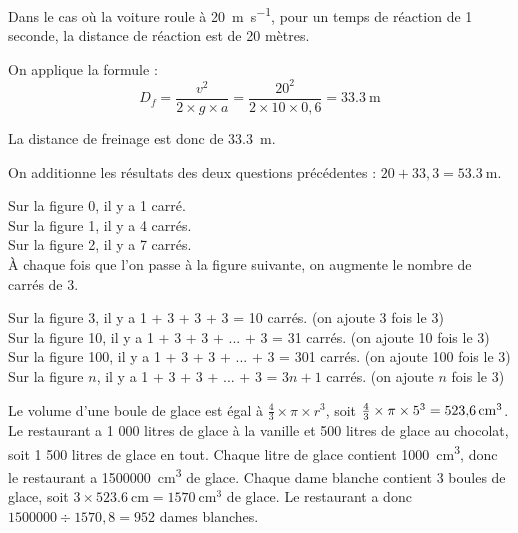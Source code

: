 \documentclass[../Cours.tex]{subfiles}
\begin{document}
\clearpage
\thispagestyle{empty}
\color{black}

\titreDScorrection

\begin{questions}
\EXERCICE{}

\question Dans le cas où la voiture roule à \qty{20}{\metre\per\second}, pour un temps de réaction de 1 seconde, la distance de réaction est de 20 mètres.

\question On applique la formule :
$$D_f = \frac{v^2}{2 \times g \times a} = \frac{20^2}{2 \times 10 \times 0,6} = \qty{33,3}{\metre} $$

La distance de freinage est donc de \qty{33,3}{\metre}.

\question On additionne les résultats des deux questions précédentes : $20 + 33,3 = \qty{53,3}{\metre}$.

\EXERCICE{}

Sur la figure 0, il y a 1 carré.\\
Sur la figure 1, il y a 4 carrés.\\
Sur la figure 2, il y a 7 carrés.\\

À chaque fois que l'on passe à la figure suivante, on augmente le nombre de carrés de 3.

Sur la figure 3, il y a 1 + 3 + 3 + 3 = 10 carrés. (on ajoute 3 fois le 3)\\
Sur la figure 10, il y a 1 + 3 + 3 + ... + 3 = 31 carrés. (on ajoute 10 fois le 3)\\
Sur la figure 100, il y a 1 + 3 + 3 + ... + 3 = 301 carrés. (on ajoute 100 fois le 3)\\
Sur la figure $n$, il y a 1 + 3 + 3 + ... + 3 = $3n+1$ carrés. (on ajoute $n$ fois le 3)

\EXERCICE{}

Le volume d'une boule de glace est égal à $\frac{4}{3} \times \pi \times r^3$, soit $\frac{4}{3} \times \pi \times 5^3 = \qty{523.6}{cm\cubed}$. Le restaurant a 1 000 litres de glace à la vanille et 500 litres de glace au chocolat, soit 1 500 litres de glace en tout. Chaque litre de glace contient \qty{1000}{\centi\metre\cubed}, donc le restaurant a \qty{1500000}{\centi\metre\cubed} de glace. Chaque dame blanche contient 3 boules de glace, soit $3 \times \qty{523,6}{\centi\metre} = \qty{1570}{\centi\metre\cubed}$ de glace. Le restaurant a donc $1 500 000 \div 1570,8 = 952$ dames blanches.

\clearpage
{}

\begin{center}
\end{center}


\end{questions}
\end{document}
